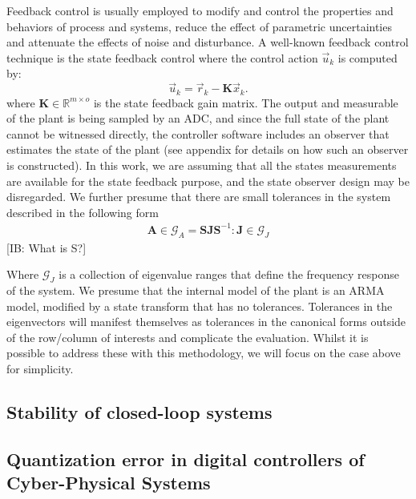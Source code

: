 \documentclass[runningheads,a4paper]{llncs}
\newcommand{\commentib}[1]{{\color{blue} [IB: #1]}}
\newcommand{\mat}[1]{\boldsymbol{#1}}
\begin{document}
Feedback control is usually employed to modify and control the properties and behaviors of process and systems, reduce the effect of parametric uncertainties and attenuate the effects of noise and disturbance. A well-known feedback control technique is the state feedback control where the control action $\vec{u}_k$ is computed by:
%
\begin{equation}
\vec{u}_k=\vec{r}_{k}-\mat{K}\vec{x}_k.
\end{equation}
%
where $\mat{K} \in \mathbb{R}^{m \times o}$ is the state feedback gain matrix.
%
The output and measurable of the plant is being sampled by an ADC, and since the full state of the
plant cannot be witnessed directly, the controller software includes an observer that 
estimates the state of the plant (see appendix for details on how such an observer
is constructed). In this work, we are assuming that all the states measurements are available for the state feedback purpose, and the state observer design may be disregarded.  We further presume that there are small tolerances in the system 
described in the following form
%
\begin{align*}
\mat{A} \in \mathcal{G}_A=\mat{S}\mat{J}\mat{S}^{-1} : \mat{J} \in \mathcal{G}_J
\end{align*}
\commentib{What is S?}

Where $\mathcal{G}_J$ is a collection of eigenvalue ranges that define the frequency response of the system.
We presume that the internal model of the plant is an ARMA model, modified by a
state transform that has no tolerances. Tolerances in the eigenvectors will manifest themselves
as tolerances in the canonical forms outside of the row/column of interests and complicate the 
evaluation. Whilst it is possible to address these with this methodology, we will focus on the case
above for simplicity.

\subsection{Stability of closed-loop systems}
\label{ssec:stability}

\subsection{Quantization error in digital controllers of Cyber-Physical Systems}
\label{ssec:quantizationerror}
\end{document}
